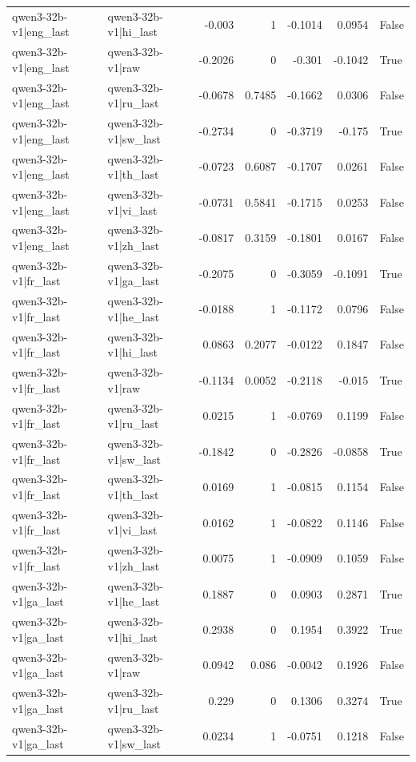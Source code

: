 \begin{table}
\begin{tabular}{l l r r r r l}
qwen3-32b-v1|eng_last & qwen3-32b-v1|hi_last & -0.003 & 1 & -0.1014 & 0.0954 & False \\
qwen3-32b-v1|eng_last & qwen3-32b-v1|raw & -0.2026 & 0 & -0.301 & -0.1042 & True \\
qwen3-32b-v1|eng_last & qwen3-32b-v1|ru_last & -0.0678 & 0.7485 & -0.1662 & 0.0306 & False \\
qwen3-32b-v1|eng_last & qwen3-32b-v1|sw_last & -0.2734 & 0 & -0.3719 & -0.175 & True \\
qwen3-32b-v1|eng_last & qwen3-32b-v1|th_last & -0.0723 & 0.6087 & -0.1707 & 0.0261 & False \\
qwen3-32b-v1|eng_last & qwen3-32b-v1|vi_last & -0.0731 & 0.5841 & -0.1715 & 0.0253 & False \\
qwen3-32b-v1|eng_last & qwen3-32b-v1|zh_last & -0.0817 & 0.3159 & -0.1801 & 0.0167 & False \\
qwen3-32b-v1|fr_last & qwen3-32b-v1|ga_last & -0.2075 & 0 & -0.3059 & -0.1091 & True \\
qwen3-32b-v1|fr_last & qwen3-32b-v1|he_last & -0.0188 & 1 & -0.1172 & 0.0796 & False \\
qwen3-32b-v1|fr_last & qwen3-32b-v1|hi_last & 0.0863 & 0.2077 & -0.0122 & 0.1847 & False \\
qwen3-32b-v1|fr_last & qwen3-32b-v1|raw & -0.1134 & 0.0052 & -0.2118 & -0.015 & True \\
qwen3-32b-v1|fr_last & qwen3-32b-v1|ru_last & 0.0215 & 1 & -0.0769 & 0.1199 & False \\
qwen3-32b-v1|fr_last & qwen3-32b-v1|sw_last & -0.1842 & 0 & -0.2826 & -0.0858 & True \\
qwen3-32b-v1|fr_last & qwen3-32b-v1|th_last & 0.0169 & 1 & -0.0815 & 0.1154 & False \\
qwen3-32b-v1|fr_last & qwen3-32b-v1|vi_last & 0.0162 & 1 & -0.0822 & 0.1146 & False \\
qwen3-32b-v1|fr_last & qwen3-32b-v1|zh_last & 0.0075 & 1 & -0.0909 & 0.1059 & False \\
qwen3-32b-v1|ga_last & qwen3-32b-v1|he_last & 0.1887 & 0 & 0.0903 & 0.2871 & True \\
qwen3-32b-v1|ga_last & qwen3-32b-v1|hi_last & 0.2938 & 0 & 0.1954 & 0.3922 & True \\
qwen3-32b-v1|ga_last & qwen3-32b-v1|raw & 0.0942 & 0.086 & -0.0042 & 0.1926 & False \\
qwen3-32b-v1|ga_last & qwen3-32b-v1|ru_last & 0.229 & 0 & 0.1306 & 0.3274 & True \\
qwen3-32b-v1|ga_last & qwen3-32b-v1|sw_last & 0.0234 & 1 & -0.0751 & 0.1218 & False \\

\end{tabular}
\end{table}
